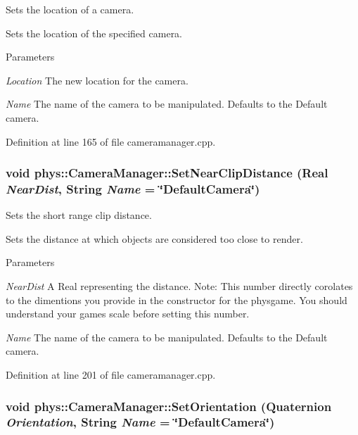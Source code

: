 Sets the location of a camera. 

Sets the location of the specified camera. 
\begin{DoxyParams}{Parameters}
\item[{\em Location}]The new location for the camera. \item[{\em Name}]The name of the camera to be manipulated. Defaults to the Default camera. \end{DoxyParams}


Definition at line 165 of file cameramanager.cpp.

\hypertarget{classphys_1_1CameraManager_ad639c275a2bb1c6c05a8800f8e8412c6}{
\subsubsection[{SetNearClipDistance}]{\setlength{\rightskip}{0pt plus 5cm}void phys::CameraManager::SetNearClipDistance ({\bf Real} {\em NearDist}, \/  {\bf String} {\em Name} = {\ttfamily \char`\"{}DefaultCamera\char`\"{}})}}
\label{d9/d91/classphys_1_1CameraManager_ad639c275a2bb1c6c05a8800f8e8412c6}


Sets the short range clip distance. 

Sets the distance at which objects are considered too close to render. 
\begin{DoxyParams}{Parameters}
\item[{\em NearDist}]A Real representing the distance. Note: This number directly corolates to the dimentions you provide in the constructor for the physgame. You should understand your games scale before setting this number. \item[{\em Name}]The name of the camera to be manipulated. Defaults to the Default camera. \end{DoxyParams}


Definition at line 201 of file cameramanager.cpp.

\hypertarget{classphys_1_1CameraManager_a9d0fac66fbc2eb4b7247c9661427afb8}{
\subsubsection[{SetOrientation}]{\setlength{\rightskip}{0pt plus 5cm}void phys::CameraManager::SetOrientation ({\bf Quaternion} {\em Orientation}, \/  {\bf String} {\em Name} = {\ttfamily \char`\"{}DefaultCamera\char`\"{}})}}
\label{d9/d91/classphys_1_1CameraManager_a9d0fac66fbc2eb4b7247c9661427afb8}


